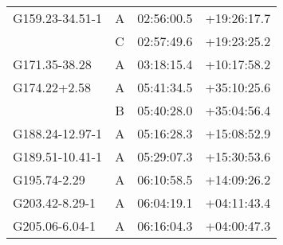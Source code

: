\documentclass[printer]{aa}
\begin{document}
\begin{table}[t]
\begin{tabular}{l c l l}
G159.23-34.51-1 & A & 02:56:00.5 & +19:26:17.7 \\
 & C & 02:57:49.6 & +19:23:25.2 \\
G171.35-38.28 & A & 03:18:15.4 & +10:17:58.2 \\
G174.22+2.58 & A & 05:41:34.5 & +35:10:25.6 \\
 & B & 05:40:28.0 & +35:04:56.4 \\
G188.24-12.97-1 & A & 05:16:28.3 & +15:08:52.9 \\
G189.51-10.41-1 & A & 05:29:07.3 & +15:30:53.6 \\
G195.74-2.29 & A & 06:10:58.5 & +14:09:26.2 \\
G203.42-8.29-1 & A & 06:04:19.1 & +04:11:43.4 \\
G205.06-6.04-1 & A & 06:16:04.3 & +04:00:47.3 \\
\hline
		\end{tabular}
	\label{sources}
\end{table}
\end{document}
